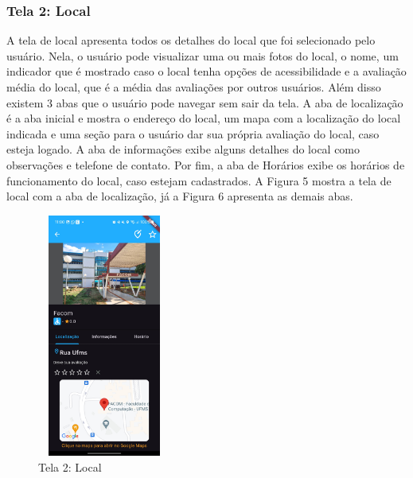     \FloatBarrier

\subsubsection{Tela 2: Local}

    A tela de local apresenta todos os detalhes do local que foi selecionado pelo usuário. Nela, o usuário pode visualizar uma ou mais fotos do local, o nome, um indicador que é mostrado caso o local tenha opções de acessibilidade e a avaliação média do local, que é a média das avaliações por outros usuários. Além disso existem 3 abas que o usuário pode navegar sem sair da tela. A aba de localização é a aba inicial e mostra o endereço do local, um mapa com a localização do local indicada e uma seção para o usuário dar sua própria avaliação do local, caso esteja logado. A aba de informações exibe alguns detalhes do local como observações e telefone de contato. Por fim, a aba de Horários exibe os horários de funcionamento do local, caso estejam cadastrados. A Figura 5 mostra a tela de local com a aba de localização, já a Figura 6 apresenta as demais abas.

    \begin{figure}[h]
        \centering
        \includegraphics[width=44mm,height=80mm]{imagens/local.jpg}
        \caption{\scriptsize Tela 2: Local}
        \label{fig:tela2}
    \end{figure}

